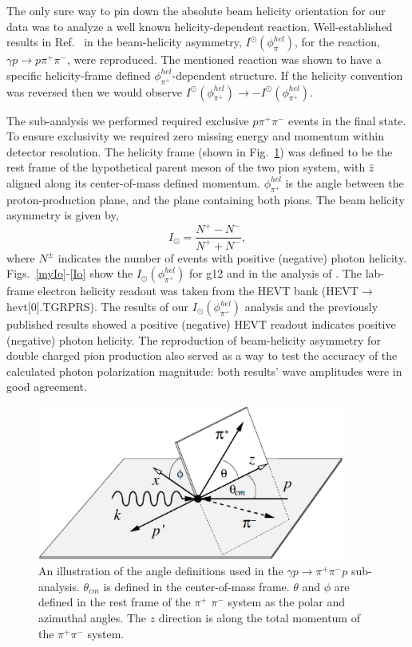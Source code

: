 The only sure way to pin down the absolute beam helicity orientation for our data was to analyze a well known helicity-dependent reaction. Well-established results in Ref.~\cite{Io} in the beam-helicity asymmetry, $I^\odot(\phi^{hel}_\pi)$, for the reaction, $\gamma p \to p \pi^+ \pi^-$, were reproduced.  The mentioned reaction was shown to have a specific helicity-frame defined $\phi^{hel}_{\pi^+}$-dependent structure.  If the helicity convention was reversed then we would observe $I^\odot(\phi^{hel}_{\pi^+}) \to -I^\odot(\phi^{hel}_{\pi^+})$.

The sub-analysis we performed required exclusive $p \pi^+ \pi^-$ events in the final state. To ensure exclusivity we required zero missing energy and momentum within detector resolution. The helicity frame (shown in Fig.~\ref{ioplane}) was defined to be the rest frame of the hypothetical parent meson of the two pion system, with  $\hat{z}$ aligned along its center-of-mass defined momentum. $\phi^{hel}_{\pi^+}$ is the angle between the proton-production plane, and the plane containing both pions. The beam helicity asymmetry is given by,
\begin{equation}
I_\odot = \frac{N^+ - N^-}{N^+ + N^-},
\end{equation}
where $N^\pm$ indicates the number of events with positive (negative) photon helicity.  Figs.~\ref{myIo}-\ref{Io} show the $I_{\odot}(\phi^{hel}_{\pi^+})$ for g12 and in the analysis of \cite{Io}.
The lab-frame electron helicity readout was taken from the HEVT bank (HEVT$\to$hevt[0].TGRPRS). The results of our $I_{\odot}(\phi^{hel}_{\pi^+})$ analysis and the previously published results showed a positive (negative) HEVT readout indicates positive (negative) photon helicity. The reproduction of beam-helicity asymmetry for double charged pion production also served as a way to test the accuracy of the calculated photon polarization magnitude: both results' wave amplitudes were in good agreement.

\begin{figure}[h]
\begin{center}
 \includegraphics[width=0.9\textwidth]{figures/calib/pol/ioplane.eps}
  \caption{An illustration of the angle definitions used in the $\gamma p \to \pi^+ \pi^- p$ sub-analysis. $\theta_{cm}$ is defined in the center-of-mass frame. $\theta$ and $\phi$ are defined in the rest frame of the $\pi^+$ $\pi^-$ system as the polar and azimuthal angles. The $z$ direction is along the total momentum of the $\pi^+ \pi^-$ system.}
  \label{ioplane}
  \end{center}
\end{figure}


